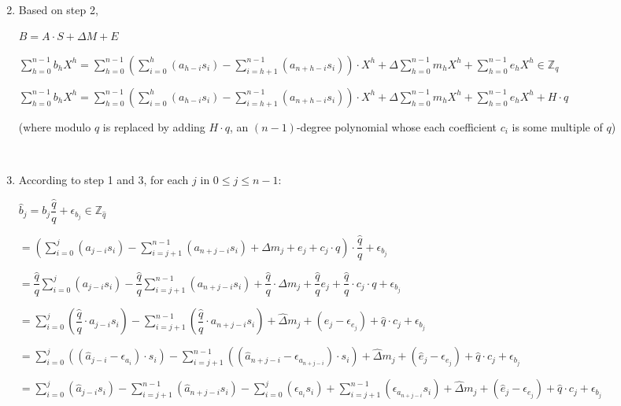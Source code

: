 \begin{enumerate}
$ $




\item Based on step 2,

$B = A \cdot S + \Delta  M + E$ 


$\sum\limits_{h=0}^{n-1}  b_h  X^{h}  = \sum\limits_{h=0}^{n-1}  \left(\sum\limits_{i=0}^{h}(a_{h-i}s_{i}) - \sum\limits_{i=h+1}^{n-1}(a_{n+h-i}s_{i}) \right)\cdot X^{h}  + \Delta \sum\limits_{h=0}^{n-1}  m_h  X^{h} + \sum\limits_{h=0}^{n-1}  e_h  X^{h}  \in \mathbb{Z}_q$

$\sum\limits_{h=0}^{n-1}  b_h  X^{h}  = \sum\limits_{h=0}^{n-1}  \left(\sum\limits_{i=0}^{h}(a_{h-i}s_{i}) - \sum\limits_{i=h+1}^{n-1}(a_{n+h-i}s_{i}) \right)\cdot X^{h}  + \Delta \sum\limits_{h=0}^{n-1}  m_h  X^{h} + \sum\limits_{h=0}^{n-1}  e_h  X^{h} + H \cdot q$

(where modulo $q$ is replaced by adding $H \cdot q$, an $(n-1)$-degree polynomial whose each coefficient $c_i$ is some multiple of $q$)

$ $

\item According to step 1 and 3, for each $j$ in $0 \leq j \leq n-1$:

$\hat{b}_j = b_j\dfrac{\hat{q}}{q} + \epsilon_{b_j} \in \mathbb{Z}_{\hat{q}}$

$= \left(\sum\limits_{i=0}^{j}(a_{j-i}s_{i}) - \sum\limits_{i=j+1}^{n-1}(a_{n+j-i}s_{i}) + \Delta m_j + e_j + c_j \cdot q\right) \cdot \dfrac{\hat{q}}{q} + \epsilon_{b_j}$

$= \dfrac{\hat{q}}{q} \sum\limits_{i=0}^{j}(a_{j-i}s_{i}) - \dfrac{\hat{q}}{q} \sum\limits_{i=j+1}^{n-1}(a_{n+j-i}s_{i}) + \dfrac{\hat{q}}{q} \cdot \Delta m_j + \dfrac{\hat{q}}{q} e_j + \dfrac{\hat{q}}{q} \cdot c_j \cdot q + \epsilon_{b_j}$

$=  \sum\limits_{i=0}^{j}\left(\dfrac{\hat{q}}{q}\cdot a_{j-i}s_{i}\right) - \sum\limits_{i=j+1}^{n-1}\left(\dfrac{\hat{q}}{q} \cdot a_{n+j-i}s_{i}\right) + \hat{\Delta} m_j + (\hat{e}_j - \epsilon_{e_j}) + \hat{q} \cdot c_j + \epsilon_{b_j}$

$=  \sum\limits_{i=0}^{j}((\hat{a}_{j-i}-\epsilon_{a_i})\cdot s_{i}) - \sum\limits_{i=j+1}^{n-1}((\hat{a}_{n+j-i}-\epsilon_{a_{n+j-i}})\cdot s_{i}) + \hat{\Delta} m_j + (\hat{e}_j - \epsilon_{e_j}) + \hat{q} \cdot c_j + \epsilon_{b_j}$

$=  \sum\limits_{i=0}^{j}(\hat{a}_{j-i}s_i) 
- \sum\limits_{i=j+1}^{n-1}(\hat{a}_{n+j-i}s_i)
- \sum\limits_{i=0}^{j}(\epsilon_{a_i} s_i)
+ \sum\limits_{i=j+1}^{n-1}(\epsilon_{a_{n+j-i}} s_i)
+ \hat{\Delta} m_j + (\hat{e}_j - \epsilon_{e_j}) + \hat{q} \cdot c_j + \epsilon_{b_j}$



\end{enumerate}
